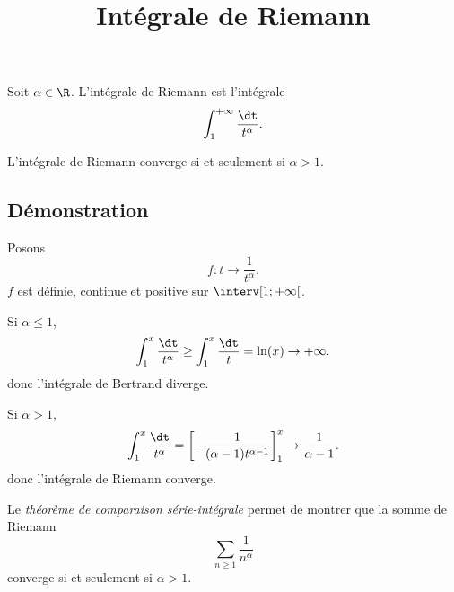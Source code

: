 \documentclass[fontsize=12pt,twoside=false,parskip=half, french]{scrartcl}
\title{Intégrale de Riemann}
\date{}
\author{}
\begin{document}
\maketitle
    Soit $\alpha \in \R$. L’intégrale de Riemann est l’intégrale
   \[
      \int_1^{+\infty} \frac{\dt}{t^\alpha}.
   \]
   \begin{Theoreme}
      L’intégrale de Riemann converge si et seulement si $\alpha > 1$.
   \end{Theoreme}
   \subsection{Démonstration}
      Posons
      \[
         f \colon t \to \frac{1}{t^\alpha}.
      \]
      $f$ est définie, continue et positive sur $\interv[1 ; +\infty[$.
      
      Si $\alpha \leq 1$,
      \[
         \int_1^{x} \frac{\dt}{t^\alpha} \geq \int_1^{x} \frac{\dt}{t} = \ln(x) \to +\infty.
      \]
      donc l’intégrale de Bertrand diverge.
      
      Si $\alpha > 1$,
      \[
         \int_1^{x} \frac{\dt}{t^\alpha} = \left[-\frac{1}{(\alpha - 1) t^{\alpha - 1}}\right]_1^x \to \frac{1}{\alpha - 1}.
      \]
      donc l’intégrale de Riemann converge.
   
   \begin{Theoreme}
      Le \emph{théorème de comparaison série-intégrale} permet de montrer que la somme de Riemann 
      \[
         \sum_{n \geq 1} \frac{1}{n^\alpha}
      \]
      converge si et seulement si $\alpha > 1$.
   \end{Theoreme}
\end{document}
